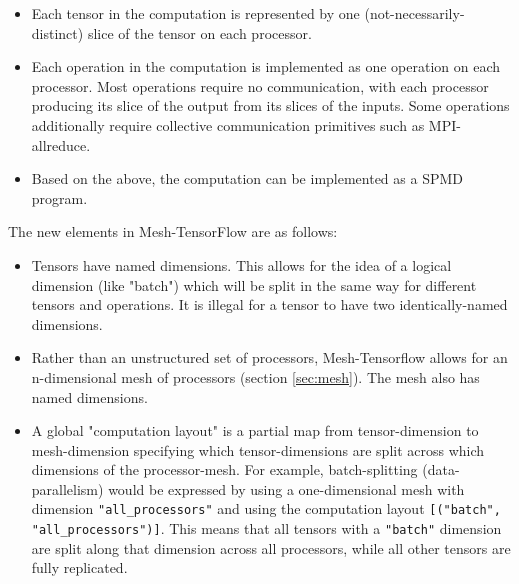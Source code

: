 \documentclass{article}
\begin{document}
\begin{itemize}

\item Each tensor in the computation is represented by one (not-necessarily-distinct) slice of the tensor on each processor.

\item Each operation in the computation is implemented as one operation on each processor.  Most operations require no communication, with each processor producing its slice of the output from its slices of the inputs.  Some operations additionally require collective communication primitives such as MPI-allreduce.

\item Based on the above, the computation can be implemented as a SPMD program.

\end{itemize}

The new elements in Mesh-TensorFlow are as follows:

\begin{itemize}

\item Tensors have named dimensions.  This allows for the idea of a logical dimension (like "batch") which will be split in the same way for different tensors and operations.  It is illegal for a tensor to have two identically-named dimensions. 

\item Rather than an unstructured set of processors, Mesh-Tensorflow allows for an n-dimensional mesh of processors (section \ref{sec:mesh}).  The mesh also has named dimensions.

\item A global "computation layout" is a partial map from tensor-dimension to mesh-dimension specifying which tensor-dimensions are split across which dimensions of the processor-mesh.  For example, batch-splitting (data-parallelism) would be expressed by using a one-dimensional mesh with dimension \texttt{"all\_processors"} and using the computation layout \texttt{[("batch", "all\_processors")]}.  This means that all tensors with a \texttt{"batch"} dimension are split along that dimension across all processors, while all other tensors are fully replicated.  

\end{itemize}
\end{document}
